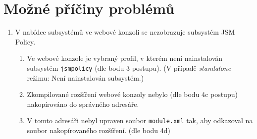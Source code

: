 \section{Možné příčiny problémů}
\begin{enumerate}
    \item V nabídce subsystémů ve webové konzoli se nezobrazuje subsystém JSM Policy.
    \begin{enumerate}
        \item Ve webové konzole je vybraný profil, v kterém není nainstalován subsystém {\tt jsmpolicy} (dle bodu 3 postupu). (V případě {\it standalone} režimu: Není nainstalován subsystém.)
        \item Zkompilované rozšíření webové konzoly nebylo (dle bodu 4c postupu) nakopírováno do správného adresáře.
        \item V tomto adresáři nebyl upraven soubor {\tt module.xml} tak, aby odkazoval na soubor nakopírovaného rozšíření. (dle bodu 4d)
    \end{enumerate}
\end{enumerate}



